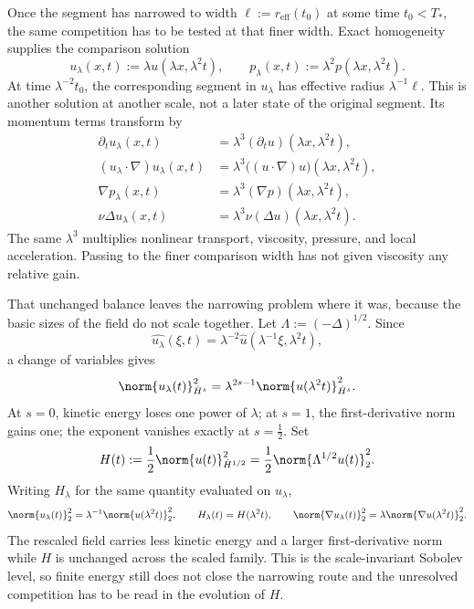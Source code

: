 
Once the segment has narrowed to width \(\ell:=r_{\mathrm{eff}}(t_0)\) at some time \(t_0<T_*\), the same competition has to be tested at that finer width. Exact \NavierStokes{} homogeneity supplies the comparison solution
\[
  u_\lambda(x,t)
  :=
  \lambda u(\lambda x,\lambda^2t),
  \qquad
  p_\lambda(x,t)
  :=
  \lambda^2p(\lambda x,\lambda^2t).
\]
At time \(\lambda^{-2}t_0\), the corresponding segment in \(u_\lambda\) has effective radius \(\lambda^{-1}\ell\). This is another solution at another scale, not a later state of the original segment. Its momentum terms transform by
\[
\begin{aligned}
  \partial_tu_\lambda(x,t)
  &=
  \lambda^3(\partial_tu)(\lambda x,\lambda^2t),
  \\
  (u_\lambda\cdot\nabla)u_\lambda(x,t)
  &=
  \lambda^3\bigl((u\cdot\nabla)u\bigr)(\lambda x,\lambda^2t),
  \\
  \nabla p_\lambda(x,t)
  &=
  \lambda^3(\nabla p)(\lambda x,\lambda^2t),
  \\
  \nu\Delta u_\lambda(x,t)
  &=
  \lambda^3\nu(\Delta u)(\lambda x,\lambda^2t).
\end{aligned}
\]
The same \(\lambda^3\) multiplies nonlinear transport, viscosity, pressure, and local acceleration. Passing to the finer comparison width has not given viscosity any relative gain.


That unchanged balance leaves the narrowing problem where it was, because the basic sizes of the field do not scale together. Let \(\Lambda:=(-\Delta)^{1/2}\). Since
\[
  \widehat{u_\lambda}(\xi,t)
  =
  \lambda^{-2}\widehat u(\lambda^{-1}\xi,\lambda^2t),
\]
a change of variables gives
\[
  \norm{u_\lambda(t)}_{\dot H^s}^2
  =
  \lambda^{2s-1}
  \norm{u(\lambda^2t)}_{\dot H^s}^2.
\]
At \(s=0\), kinetic energy loses one power of \(\lambda\); at \(s=1\), the first-derivative norm gains one; the exponent vanishes exactly at \(s=\tfrac12\). Set
\[
  H(t)
  :=
  \frac12\norm{u(t)}_{\dot H^{1/2}}^2
  =
  \frac12\norm{\Lambda^{1/2}u(t)}_2^2.
\]
Writing \(H_\lambda\) for the same quantity evaluated on \(u_\lambda\),
\[
  \norm{u_\lambda(t)}_2^2
  =
  \lambda^{-1}\norm{u(\lambda^2t)}_2^2,
  \qquad
  H_\lambda(t)=H(\lambda^2t),
  \qquad
  \norm{\nabla u_\lambda(t)}_2^2
  =
  \lambda\norm{\nabla u(\lambda^2t)}_2^2.
\]
The rescaled field carries less kinetic energy and a larger first-derivative norm while \(H\) is unchanged across the scaled family. This is the scale-invariant Sobolev level, so finite energy still does not close the narrowing route and the unresolved competition has to be read in the evolution of \(H\).

